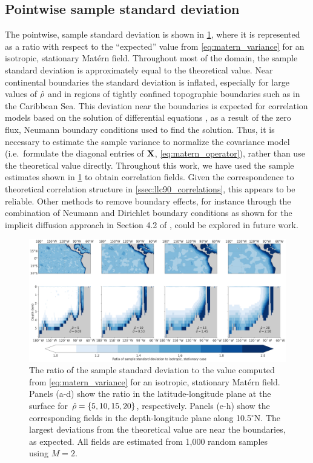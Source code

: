 \subsection{Pointwise sample standard deviation}
\label{ssec:llc90_boundary_effects}


The pointwise, sample standard deviation is shown in \cref{fig:std_ratio}, where
it is represented as a ratio with respect to the ``expected'' value from
\cref{eq:matern_variance} for an isotropic, stationary Mat\'ern field.
Throughout most of the domain, the sample standard deviation is approximately
equal to the theoretical value.
Near continental boundaries the standard deviation is inflated, especially
for large values of $\hat{\rho}$ and in regions of tightly confined topographic
boundaries such as in the Caribbean Sea.
This deviation near the boundaries is expected for correlation models based on
the solution of differential equations
\citep[e.g.][]{weaver_correlation_2001,RSSB:RSSB777}, as a result of the zero
flux, Neumann boundary conditions used to find the solution.
Thus, it is necessary to estimate the sample variance to normalize the
covariance model (i.e.\ formulate the diagonal entries of $\mathbf{X}$,
\cref{eq:matern_operator}), rather than use the theoretical value directly.
Throughout this work, we have used the sample estimates shown in
\cref{fig:std_ratio} to obtain correlation fields.
Given the correspondence to theoretical correlation structure in
\cref{ssec:llc90_correlations}, this appears to be reliable.
Other methods to remove boundary effects, for instance through the
combination of Neumann and Dirichlet boundary conditions as shown for the
implicit diffusion approach in Section 4.2 of
\citet{mirouze_representation_2010}, could be explored in future work.

\begin{figure}
    \centering
    \includegraphics[width=\textwidth]{../figures/std_ratio_02apps.jpg}
    \caption{The ratio of the sample standard deviation to the value computed
        from \cref{eq:matern_variance} for an isotropic, stationary Mat\'ern
        field. Panels (a-d) show the ratio in the latitude-longitude plane at
        the surface for $\hat{\rho}=\{5,10,15,20\}$, respectively. Panels (e-h)
        show the corresponding fields in the depth-longitude plane along 10.5$^\circ$N.
        The largest deviations from the theoretical value are near the boundaries, as
        expected.
        All fields are estimated from 1,000 random samples using $M=2$.
    }
    \label{fig:std_ratio}
\end{figure}

